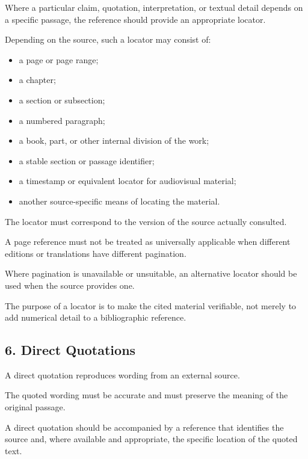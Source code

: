 Where a particular claim, quotation,
interpretation, or textual detail
depends on a specific passage,
the reference should provide
an appropriate locator.

Depending on the source, such
a locator may consist of:

\begin{itemize}
    \item a page or page range;
    \item a chapter;
    \item a section or subsection;
    \item a numbered paragraph;
    \item a book, part, or other
    internal division of the work;
    \item a stable section or
    passage identifier;
    \item a timestamp or equivalent
    locator for audiovisual material;
    \item another source-specific
    means of locating the material.
\end{itemize}

The locator must correspond
to the version of the source
actually consulted.

A page reference must not be
treated as universally applicable
when different editions or
translations have different
pagination.

Where pagination is unavailable
or unsuitable, an alternative
locator should be used when
the source provides one.

The purpose of a locator is
to make the cited material
verifiable, not merely to
add numerical detail to a
bibliographic reference.


\subsection*{6. Direct Quotations}

A direct quotation reproduces
wording from an external source.

The quoted wording must be
accurate and must preserve
the meaning of the original
passage.

A direct quotation should
be accompanied by a reference
that identifies the source
and, where available and
appropriate, the specific
location of the quoted text.

